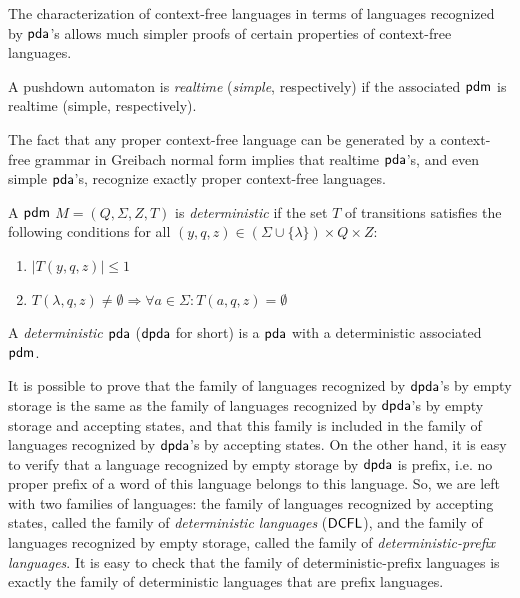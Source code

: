 The characterization of context-free languages in terms of languages recognized by \index{$\pda$}$\pda$'s allows much simpler proofs of certain properties of context-free languages.

A pushdown automaton is \emph{realtime} (\emph{simple}, respectively) if the associated \index{$\pdm$}$\pdm$ is realtime (simple, respectively).

The fact that any proper context-free language can be generated by a context-free grammar in Greibach normal form implies that realtime \index{$\pda$}$\pda$'s, and even simple \index{$\pda$}$\pda$'s, recognize exactly proper context-free languages.

A \index{$\pdm$}$\pdm$ $M = (Q, \Sigma, Z, T)$ is \emph{deterministic} if the set $T$ of transitions satisfies the following conditions for all $(y, q, z) \in (\Sigma \cup \{\lambda\}) \times Q \times Z$:

\begin{enumerate}
\item $|T(y, q, z)| \le 1$
\item $T(\lambda, q, z) \neq \emptyset \Rightarrow \forall a \in \Sigma: T(a, q, z) = \emptyset$
\end{enumerate}

A \emph{deterministic $\pda$} \index{$\dpda$}($\dpda$ for short) is a $\pda$ with a deterministic associated \index{$\pdm$}$\pdm$.

It is possible to prove that the family of languages recognized by $\dpda$'s by empty storage is the same as the family of languages recognized by $\dpda$'s by empty storage and accepting states, and that this family is included in the family of languages recognized by $\dpda$'s by accepting states. On the other hand, it is easy to verify that a language recognized by empty storage by $\dpda$ is prefix, i.e. no proper prefix of a word of this language belongs to this language. So, we are left with two families of languages: the family of languages recognized by accepting states, called the family of \emph{deterministic languages} \index{$\DCFL$}($\DCFL$), and the family of languages recognized by empty storage, called the family of  \emph{deterministic-prefix languages}. It is easy to check that the family of deterministic-prefix languages is exactly the family of deterministic languages that are prefix languages.

